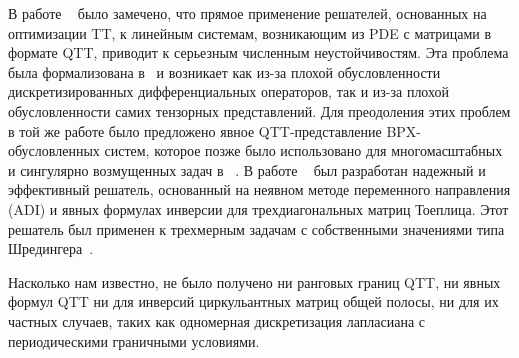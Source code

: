 В работе ~\cite{cor-eccomas-2016,kazeev2018quantized,cor-robqtt-2016pre} было замечено, что прямое применение решателей, основанных на оптимизации TT, к линейным системам, возникающим из PDE с матрицами в формате QTT, приводит к серьезным численным неустойчивостям.
Эта проблема была формализована в~\cite{bachmayr2018stability} и возникает как из-за плохой обусловленности дискретизированных дифференциальных операторов, так и из-за плохой обусловленности самих тензорных представлений.
Для преодоления этих проблем в той же работе было предложено явное QTT-представление BPX-обусловленных систем, которое позже было использовано для многомасштабных и сингулярно возмущенных задач в ~\cite{kazeev2020quantized,marcati2020low}.
В работе ~\cite{rakhuba2021robust} был разработан надежный и эффективный решатель, основанный на неявном методе переменного направления (ADI) и явных формулах инверсии для трехдиагональных матриц Тоеплица.
Этот решатель был применен к трехмерным задачам с собственными значениями типа Шредингера~\cite{marcati2019tensor}.

Насколько нам известно, не было получено ни ранговых границ QTT, ни явных формул QTT ни для инверсий циркульантных матриц общей полосы, ни для их частных случаев, таких как одномерная дискретизация лапласиана с периодическими граничными условиями.




